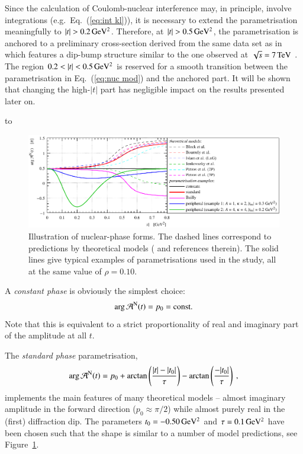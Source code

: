 Since the calculation of Coulomb-nuclear interference may, in principle, involve integrations (e.g.~Eq.~(\ref{eq:int kl})), it is necessary to extend the parametrisation meaningfully to $|t| > 0.2\,{\rm GeV^2}$. Therefore, at $|t| > 0.5\,{\rm GeV^2}$, the parametrisation is anchored to a preliminary cross-section derived from the same data set as in \cite{8tev-90m} which features a dip-bump structure similar to the one observed at $\sqrt{s} = 7\,{\rm TeV}$ \cite{epl95}. The region $0.2 < |t| < 0.5\,{\rm GeV^2}$ is reserved for a smooth transition between the parametrisation in Eq.~(\ref{eq:nuc mod}) and the anchored part. It will be shown that changing the high-$|t|$ part has negligible impact on the results presented later on.


\vskip3mm
\hbox to

\begin{figure}
\begin{center}
\includegraphics{fig/hadronic_phase_illustration.pdf}
\caption{Illustration of nuclear-phase forms. The dashed lines correspond to predictions by theoretical models (\cite{elegent} and references therein). The solid lines give typical examples of parametrisations used in the study, all at the same value of $\rho = 0.10$.
}
\label{fig:phase illustration}
\end{center}
\end{figure}


A {\it constant phase} is obviously the simplest choice:
\begin{equation}
\label{eq:nuc phase con}
\arg {\cal A}^{\rm N}(t) = p_0 = \hbox{const.}
\end{equation}
Note that this is equivalent to a strict proportionality of real and imaginary part of the amplitude at all $t$.

The {\it standard phase} parametrisation,
\begin{equation}
\label{eqn:nuc phase std}
\arg {\cal A}^{\rm N}(t) = p_{0} + \arctan \left(\frac{|t|-|t_{0}|}{\tau}\right) -  \arctan \left(\frac{-|t_{0}|}{\tau}\right) \: ,
\end{equation}
implements the main features of many theoretical models -- almost imaginary amplitude in the forward direction ($p_0 \approx \pi/2$) while almost purely real in the (first) diffraction dip. The parameters $t_0 = - 0.50\,{\rm GeV^2}$ and $\tau = 0.1\,{\rm GeV^2}$ have been chosen such that the shape is similar to a number of model predictions, see Figure~\ref{fig:phase illustration}.

